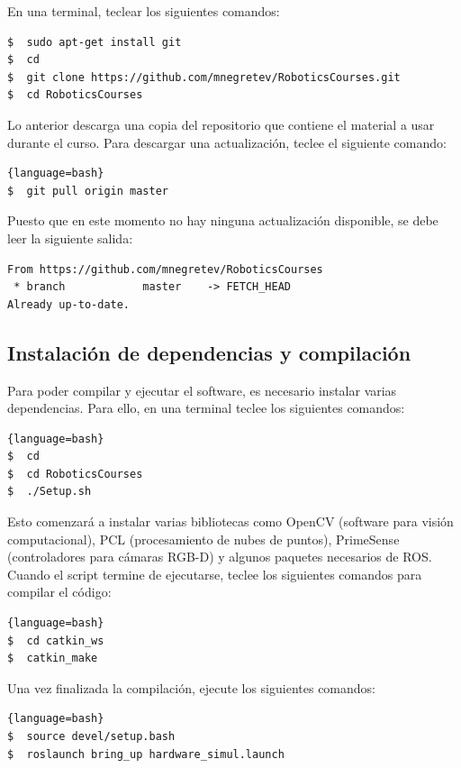 \documentclass[letterpaper,12pt]{article}
\begin{document}
En una terminal, teclear los siguientes comandos:

\begin{lstlisting}[language=bash]
$  sudo apt-get install git
$  cd
$  git clone https://github.com/mnegretev/RoboticsCourses.git
$  cd RoboticsCourses
\end{lstlisting}

Lo anterior descarga una copia del repositorio que contiene el material a usar durante el curso. Para descargar una actualización, teclee el siguiente comando:

\begin{lstlisting}{language=bash}
$  git pull origin master
\end{lstlisting}

Puesto que en este momento no hay ninguna actualización disponible, se debe leer la siguiente salida:

\begin{verbatim}
From https://github.com/mnegretev/RoboticsCourses
 * branch            master    -> FETCH_HEAD
Already up-to-date.
\end{verbatim}

\subsection{Instalación de dependencias y compilación}
Para poder compilar y ejecutar el software, es necesario instalar varias dependencias. Para ello, en una terminal teclee los siguientes comandos:

\begin{lstlisting}{language=bash}
$  cd
$  cd RoboticsCourses
$  ./Setup.sh
\end{lstlisting}

Esto comenzará a instalar varias bibliotecas como OpenCV (software para visión computacional), PCL (procesamiento de nubes de puntos), PrimeSense (controladores para cámaras RGB-D) y algunos paquetes necesarios de ROS. Cuando el script termine de ejecutarse, teclee los siguientes comandos para compilar el código:

\begin{lstlisting}{language=bash}
$  cd catkin_ws
$  catkin_make
\end{lstlisting}

Una vez finalizada la compilación, ejecute los siguientes comandos:

\begin{lstlisting}{language=bash}
$  source devel/setup.bash
$  roslaunch bring_up hardware_simul.launch
\end{lstlisting}
\end{document}

